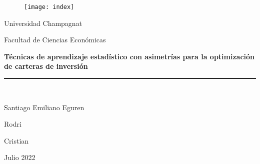 \documentclass[12pt]{article}
\begin{document}



\begin{titlepage}

\begin{center}
\vspace*{-1in}
\begin{figure}[htb]
\begin{center}
\texttt{[image: index]}
\end{center}
\end{figure}








Universidad Champagnat\\
\vspace*{0.15in}

Facultad de Ciencias Económicas \\
\vspace*{0.6in}



\begin{Large}
\textbf{Técnicas de aprendizaje estadístico con asimetrías para la optimización de carteras de inversión} \\
\end{Large}
\vspace*{0.3in}

\rule{80mm}{0.1mm}\\
\vspace*{0.1in}


\begin{large}
Santiago Emiliano Eguren
\end{large}
\vspace*{0.3in}




\begin{large}
Rodri\\
\end{large}
\vspace*{0.3in}



\begin{large}
Cristian\\
\end{large}
\vspace*{0.3in}


\begin{large}
Julio 2022
\end{large}
\vspace*{0.3in}



\end{center}

\end{titlepage}
\end{document}
